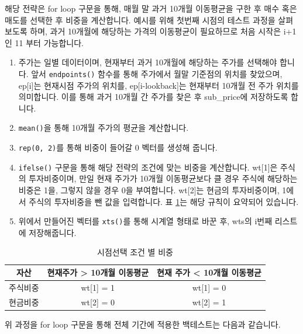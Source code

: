 \documentclass[12pt,]{book}
\providecommand{\tightlist}{%
  \setlength{\itemsep}{0pt}\setlength{\parskip}{0pt}}
\begin{document}
해당 전략은 for loop 구문을 통해, 매월 말 과거 10개월 이동평균을 구한 후 매수 혹은 매도를 선택한 후 비중을 계산합니다. 예시를 위해 첫번째 시점의 테스트 과정을 살펴보도록 하며, 과거 10개월에 해당하는 가격의 이동평균이 필요하므로 처음 시작은 i+1 인 11 부터 가능합니다.

\begin{enumerate}
\def\labelenumi{\arabic{enumi}.}
\tightlist
\item
  주가는 일별 데이터이며, 현재부터 과거 10개월에 해당하는 주가를 선택해야 합니다. 앞서 \texttt{endpoints()} 함수를 통해 주가에서 월말 기준점의 위치를 찾았으며, ep{[}i{]}는 현재시점 주가의 위치를, ep{[}i-lookback{]}는 현재부터 10개월 전 주가 위치를 의미합니다. 이를 통해 과거 10개월 간 주가를 찾은 후 sub\_price에 저장하도록 합니다.
\item
  \texttt{mean()}을 통해 10개월 주가의 평균을 계산합니다.
\item
  \texttt{rep(0,\ 2)}를 통해 비중이 들어갈 0 벡터를 생성해 줍니다.
\item
  \texttt{ifelse()} 구문을 통해 해당 전략의 조건에 맞는 비중을 계산합니다. wt{[}1{]}은 주식의 투자비중이며, 만일 현재 주가가 10개월 이동평균보다 클 경우 주식에 해당하는 비중은 1을, 그렇지 않을 경우 0을 부여합니다. wt{[}2{]}는 현금의 투자비중이며, 1에서 주식의 투자비중을 뺀 값을 입력합니다. 표 \ref{tab:sma}는 해당 규칙이 요약되어 있습니다.
\item
  위에서 만들어진 벡터를 \texttt{xts()}를 통해 시계열 형태로 바꾼 후, wts의 i번째 리스트에 저장해줍니다.
\end{enumerate}

\begin{table}[!h]

\caption{\label{tab:sma}시점선택 조건 별 비중}
\centering
\begin{tabular}{ccc}
\toprule
자산 & 현재주가 > 10개월 이동평균 & 현재 주가 < 10개월 이동평균\\
\midrule
\rowcolor{gray!6}  주식비중 & wt[1] = 1 & wt[1] = 0\\
현금비중 & wt[2] = 0 & wt[2] = 1\\
\bottomrule
\end{tabular}
\end{table}

위 과정을 for loop 구문을 통해 전체 기간에 적용한 백테스트는 다음과 같습니다.
\end{document}

